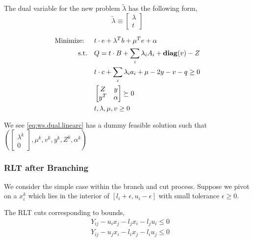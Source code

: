 \documentclass[../main]{subfiles}
\begin{document}
The dual variable for the new problem \(\tilde\lambda\) has the following form,
\begin{equation}
    \tilde\lambda \equiv \begin{bmatrix}
        \lambda \\
        t
    \end{bmatrix}
\end{equation}

\begin{equation} \label{eq:ws.dual.linearc}
    \begin{aligned}
        \textrm{Minimize: }\quad & t \cdot e +  \lambda^Tb + \mu^Te + \alpha                  \\
        \mathrm{s.t.} \quad      & Q = t \cdot B + \sum_i \lambda_i A_i  + \mathbf{diag}(v)  - Z      \\
                                 & t \cdot c + \sum_i \lambda_i a_i + \mu - 2 y - v - q \ge 0 \\
                                 & \begin{bmatrix}Z & y \\ y^T & \alpha\end{bmatrix} \succeq 0                        \\
                                 & t, \lambda, \mu, v \ge 0
    \end{aligned}
\end{equation}

We see \eqref{eq:ws.dual.linearc} has a dummy feasible solution such that \((\begin{bmatrix}
    \lambda^k \\ 0\end{bmatrix}, \mu^k, v^k, y^k, Z^k, \alpha^k)\)

\subsubsection{RLT after Branching}
We consider the simple case within the branch and cut process. Suppose we pivot on a \(x_i^k\) which lies in the interior of \(\left[l_i + \epsilon, u_i -\epsilon\right]\) with small tolerance \(\epsilon \ge 0\).

The RLT cuts corresponding to bounds,
\begin{align}
    \label{eq:ws.rlt.left}  & Y_{ij} - u_i x_j - l_j x_i - l_j u_i \le 0 \\
    \label{eq:ws.rlt.right} & Y_{ij} - u_j x_i - l_i x_j - l_i u_j \le 0
\end{align}
\end{document}

